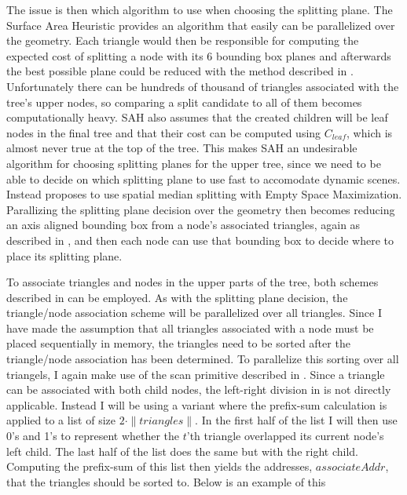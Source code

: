 The issue is then which algorithm to use when choosing the splitting plane. The
Surface Area Heuristic provides an algorithm that easily can be parallelized
over the geometry. Each triangle would then be responsible for computing the
expected cost of splitting a node with its 6 bounding box planes and afterwards
the best possible plane could be reduced with the method described in
. Unfortunately there can be hundreds of thousand of
triangles associated with the tree's upper nodes, so comparing a split candidate
to all of them becomes computationally heavy. SAH also assumes that the created
children will be leaf nodes in the final tree and that their cost can be
computed using $C_{leaf}$, which is almost never true at the top of the
tree. This makes SAH an undesirable algorithm for choosing splitting planes for
the upper tree, since we need to be able to decide on which splitting plane to
use fast to accomodate dynamic scenes. Instead \zhou{} proposes to use spatial
median splitting with Empty Space Maximization. Parallizing the splitting plane
decision over the geometry then becomes reducing an axis aligned bounding box
from a node's associated triangles, again as described in
, and then each node can use that bounding box to decide
where to place its splitting plane.

To associate triangles and nodes in the upper parts of the tree, both schemes
described in  can be employed. As with the
splitting plane decision, the triangle/node association scheme will be
parallelized over all triangles. Since I have made the assumption that all
triangles associated with a node must be placed sequentially in memory, the
triangles need to be sorted after the triangle/node association has been
determined. To parallelize this sorting over all triangels, I again make use of
the scan primitive described in . Since a triangle can
be associated with both child nodes, the left-right division in
 is not directly applicable. Instead I will be using a
variant where the prefix-sum calculation is applied to a list of size $2 \cdot
\|triangles\|$. In the first half of the list I will then use 0's and 1's to
represent whether the $t$'th triangle overlapped its current node's left
child. The last half of the list does the same but with the right
child. Computing the prefix-sum of this list then yields the addresses,
$associateAddr$, that the triangles should be sorted to. Below is an example of
this

